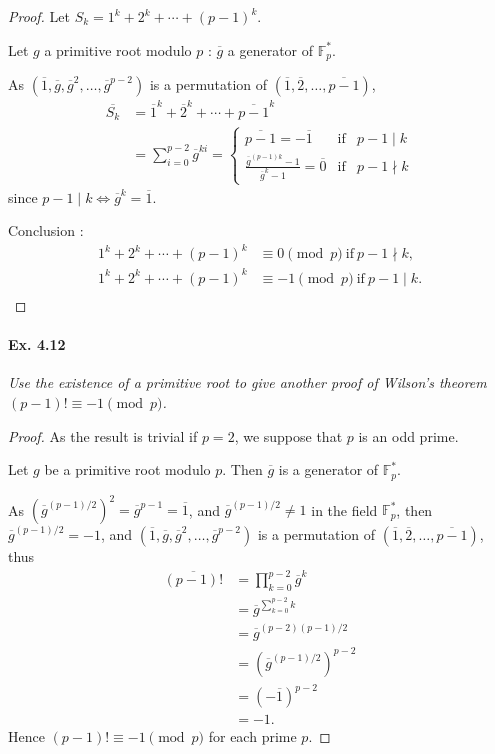 \documentclass[11pt,a4paper]{article}
\newcommand{\F}{\mathbb{F}}
\begin{document}
\begin{proof}
Let $S_k = 1^k+2^k+\cdots+(p-1)^k$.

Let $g$ a primitive root modulo $p$ : $\overline{g}$ a generator of $\F_p^*$.

As $(\overline{1},\overline{g},\overline{g}^{2}, \ldots, \overline{g}^{p-2}) $ is a permutation of $ (\overline{1},\overline{2}, \ldots,\overline{p-1})$,
\begin{align*}
\overline{S_k} &= \overline{1}^k + \overline{2}^k+\cdots+ \overline{p-1}^k\\
&= \sum_{i=0}^{p-2} \overline{g}^{ki} =
\left\{
\begin{array}{ccc}
\overline{ p-1} = -\overline{1} &  \mathrm{if} &  p-1 \mid k  \\
 \frac{ \overline{g}^{(p-1)k} -1}{ \overline{g}^k -1} = \overline{0}&  \mathrm{if}  &   p-1 \nmid k
\end{array}
\right.
\end{align*}
since $p-1 \mid k \iff \overline{g}^k = \overline{1}$.

Conclusion :
\begin{align*}
1^k+2^k+\cdots+(p-1)^k&\equiv 0 \pmod p\ \mathrm{if} \ p-1 \nmid k,\\
1^k+2^k+\cdots+(p-1)^k&\equiv -1 \pmod p\ \mathrm{if} \ p-1 \mid k.\\
\end{align*}
\end{proof}

\paragraph{Ex. 4.12}

{\it Use the existence of a primitive root to give another proof of Wilson's theorem $(p - 1)! \equiv -1  \pmod p$.
}

\begin{proof} As the result is trivial if $p=2$, we suppose that $p$ is an odd prime. 

Let $g$ be a primitive root modulo $p$. Then $\overline{g}$ is a generator of $\F_p^*$.

As $(\overline{g}^{(p-1)/2}) ^2 = \overline{g}^{p-1} = \overline{1}$, and $\overline{g}^{(p-1)/2} \neq 1$ in the field $\F_p^*$,  then $\overline{g}^{(p-1)/2} = -1$, and $(\overline{1},\overline{g},\overline{g}^{2}, \ldots, \overline{g}^{p-2}) $ is a permutation of $ (\overline{1},\overline{2}, \ldots,\overline{p-1})$, thus
\begin{align*}
\overline{(p-1)!} &= \prod_{k=0}^{p-2} \overline{g}^k\\
&= \overline{g}^{\sum_{k=0}^{p-2} k}\\
&=\overline{g}^{(p-2)(p-1)/2}\\
&=\left(\overline{g}^{(p-1)/2}\right)^{p-2}\\
&=(-\overline{1})^{p-2}\\
&= - 1.
\end{align*}
Hence $(p-1)! \equiv -1\pmod p$ for each prime $p$.
\end{proof}
\end{document}
